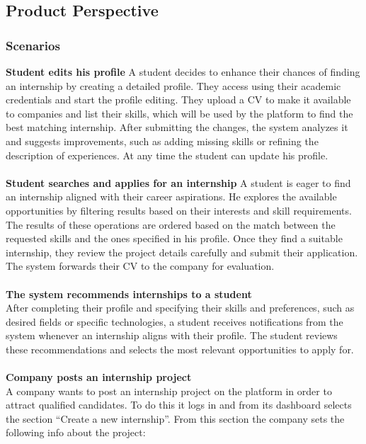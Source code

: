 \subsection{Product Perspective}
\subsubsection{Scenarios}
\textbf{Student edits his profile} \newline
A student decides to enhance their chances of finding an internship by creating a detailed profile. They access using their academic credentials and start the profile editing. They upload a CV to make it available to companies and list their skills, which will be used by the platform to find the best matching internship. After submitting the changes, the system analyzes it and suggests improvements, such as adding missing skills or refining the description of experiences. At any time the student can update his profile. \\\\
\textbf{Student searches and applies for an internship} \newline
A student is eager to find an internship aligned with their career aspirations. He explores the available opportunities by filtering results based on their interests and skill requirements. The results of these operations are ordered based on the match between the requested skills and the ones specified in his profile. Once they find a suitable internship, they review the project details carefully and submit their application. The system forwards their CV to the company for evaluation.\\\\
\textbf{The system recommends internships to a student}\\
After completing their profile and specifying their skills and preferences, such as desired fields or specific technologies, a student receives notifications from the system whenever an internship aligns with their profile. The student reviews these recommendations and selects the most relevant opportunities to apply for.\\\\
\textbf{Company posts an internship project}\\
A company wants to post an internship project on the platform in order to attract qualified candidates. To do this it logs in and from its dashboard selects the section “Create a new internship”. From this section the company sets the following info about the project: 
